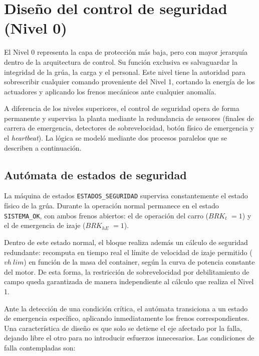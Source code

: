\newpage
\section{Diseño del control de seguridad (Nivel 0)}

El Nivel 0 representa la capa de protección más baja, pero con mayor jerarquía dentro de la
arquitectura de control. Su función exclusiva es salvaguardar la integridad de la grúa, la carga
y el personal. Este nivel tiene la autoridad para sobrescribir cualquier comando proveniente del
Nivel 1, cortando la energía de los actuadores y aplicando los frenos mecánicos ante cualquier
anomalía. 

A diferencia de los niveles superiores, el control de seguridad opera de forma permanente y
supervisa la planta mediante la redundancia de sensores (finales de carrera de emergencia,
detectores de sobrevelocidad, botón físico de emergencia y el \textit{heartbeat}). La lógica
se modeló mediante dos procesos paralelos que se describen a continuación.
\subsection{Autómata de estados de seguridad}
La máquina de estados \texttt{ESTADOS\_SEGURIDAD} supervisa constantemente el estado físico de la
grúa. Durante la operación normal permanece en el estado \texttt{SISTEMA\_OK}, con ambos frenos
abiertos: el de operación del carro (\textcolor{signalcolor}{$BRK_t$} $= 1$) y el de
emergencia de izaje (\textcolor{signalcolor}{$BRK_{hE}$} $= 1$).

Dentro de este estado normal, el bloque realiza además un cálculo de seguridad redundante:
recomputa en tiempo real el límite de velocidad de izaje permitido ($vh\ lim$)
en función de la masa del container, según la curva de potencia constante del motor. De esta forma,
la restricción de sobrevelocidad por debilitamiento de campo queda garantizada de manera
independiente al cálculo que realiza el Nivel 1.

Ante la detección de una condición crítica, el autómata transiciona a un estado de emergencia
específico, aplicando inmediatamente los frenos correspondientes. Una característica de diseño es
que solo se detiene el eje afectado por la falla, dejando libre el otro
para no introducir esfuerzos innecesarios. Las condiciones de falla contempladas son:


